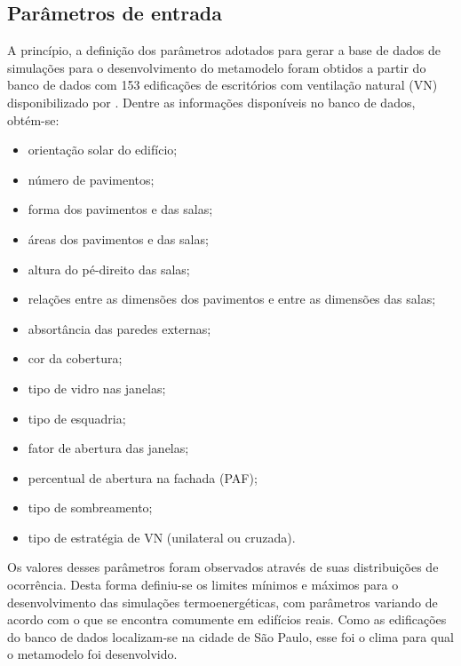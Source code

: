 \documentclass[brazil,hardcopy,openany,a5paper]{ufscthesis}
\begin{document}
		\subsection{Parâmetros de entrada}\label{subsec:par}
		
		A princípio, a definição dos parâmetros adotados para gerar a base de dados de simulações para o desenvolvimento do metamodelo foram obtidos a partir do banco de dados com 153 edificações de escritórios com ventilação natural (VN) disponibilizado por  \cite{Pereira2018}.  		
		Dentre as informações  disponíveis no banco de dados, obtém-se:

		\begin{itemize}
			\item orientação solar do edifício;
			\item número de pavimentos;
			\item forma dos pavimentos e das salas;
			\item áreas dos pavimentos e das salas;
			\item altura do pé-direito das salas;
			\item relações entre as dimensões dos pavimentos e entre as dimensões das salas;
			\item absortância das paredes externas; %
			\item cor da cobertura;
			\item tipo de vidro nas janelas;
			\item tipo de esquadria;
			\item fator de abertura das janelas;
			\item percentual de abertura na fachada (PAF);  %
			\item tipo de sombreamento;  %
			\item tipo de estratégia de VN (unilateral ou cruzada).
		\end{itemize} 
		
		Os valores desses parâmetros foram observados através de suas distribuições de ocorrência. Desta forma definiu-se os limites mínimos e máximos para o desenvolvimento das simulações termoenergéticas, com parâmetros variando de acordo com o que se encontra comumente em edifícios reais. Como as edificações do banco de dados localizam-se na cidade de São Paulo, esse foi o clima para qual o metamodelo foi desenvolvido.
		
\end{document}
